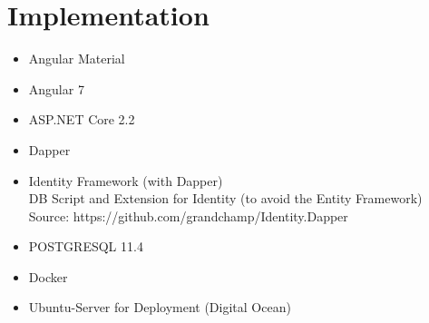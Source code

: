 \section{Implementation}
\begin{itemize}
\item Angular Material
\item Angular 7
\item ASP.NET Core 2.2
\item Dapper
\item Identity Framework (with Dapper) \\
DB Script and Extension for Identity (to avoid the Entity Framework) Source: https://github.com/grandchamp/Identity.Dapper
\item POSTGRESQL 11.4
\item Docker
\item Ubuntu-Server for Deployment (Digital Ocean)
\end{itemize}
